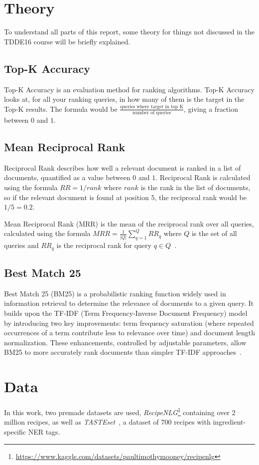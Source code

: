 \documentclass[11pt]{article}
\begin{document}
\section{Theory}
To understand all parts of this report, some theory for things not discussed in
the TDDE16 course will be briefly explained.
\subsection{Top-K Accuracy}
Top-K Accuracy is an evaluation method for ranking algorithms.
Top-K Accuracy looks at, for all your ranking queries, in how many of them is the
target in the Top-K results.
The formula would be $\frac{\text{queries where target in top K}}{\text{number of
queries}}$, giving a fraction between $0$ and $1$\cite{topkacc}.
\subsection{Mean Reciprocal Rank}
Reciprocal Rank describes how well a relevant document is ranked in a list of
documents, quantified as a value between $0$ and $1$.
Reciprocal Rank is calculated using the formula $RR = 1/rank$ where $rank$ is the
rank in the list of documents, so if the relevant document is found at position
$5$, the reciprocal rank would be $1/5 = 0.2$.

Mean Reciprocal Rank (MRR) is the mean of the reciprocal rank over all queries,
calculated using the formula $MRR = \frac{1}{|Q|} \sum_{q=1}^Q{RR_q}$ where $Q$ is
the set of all queries and $RR_q$ is the reciprocal rank for query $q \in
Q$~\cite{mrr}.
\subsection{Best Match 25}
Best Match 25 (BM25) is a probabilistic ranking function widely used in
information retrieval to determine the relevance of documents to a given query.
It builds upon the TF-IDF (Term Frequency-Inverse Document Frequency) model by
introducing two key improvements: term frequency saturation (where repeated
occurrences of a term contribute less to relevance over time) and document
length normalization. These enhancements, controlled by adjustable parameters,
allow BM25 to more accurately rank documents than simpler TF-IDF
approaches~\cite{ogBM25, improvmenetsBM25}.

\section{Data}
In this work, two premade datasets are used,
\emph{RecipeNLG}\footnote{\url{https://www.kaggle.com/datasets/paultimothymooney/recipenlg}}
containing over 2 million recipes, as well as
\emph{TASTEset}~\cite{TASTEset}, a dataset of
700 recipes with ingredient-specific NER tags.
\end{document}
